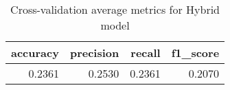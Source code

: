\begin{table}
\caption{Cross-validation average metrics for Hybrid model}
\label{tab:hybrid_metrics}
\begin{tabular}{rrrr}
\toprule
accuracy & precision & recall & f1_score \\
\midrule
0.2361 & 0.2530 & 0.2361 & 0.2070 \\
\bottomrule
\end{tabular}
\end{table}
